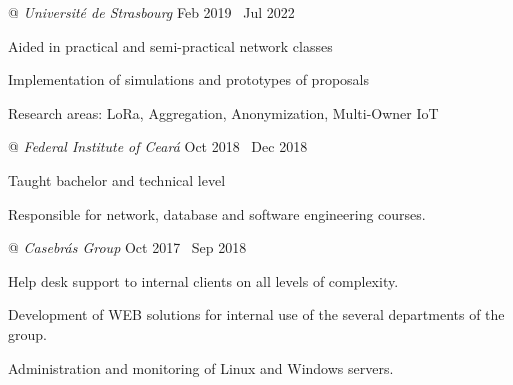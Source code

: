 \newlength{\lcolwidth}
\setlength{\lcolwidth}{.8\textwidth}
\newlength{\rcolwidth}
\setlength{\rcolwidth}{\dimexpr(\textwidth - \lcolwidth)\relax}





 @ \textit{Université de Strasbourg} \dotfill \enspace Feb 2019 \textemdash\ Jul 2022
\begin{minipage}[t]{\lcolwidth}
\raggedright
{\small \begin{zitemize}
  \item Aided in practical and semi-practical network classes
  \item Implementation of simulations and prototypes of proposals
  \item Research areas: LoRa, Aggregation, Anonymization, Multi-Owner IoT
\end{zitemize}}
\end{minipage}%
\begin{minipage}[t]{\rcolwidth}
\raggedleft
{}
\end{minipage}
\enskip




 @ \textit{Federal Institute of Ceará} \dotfill \enspace Oct 2018 \textemdash\ Dec 2018
\begin{minipage}[t]{\lcolwidth}
\raggedright
{\small \begin{zitemize}
  \item Taught bachelor and technical level

  \item Responsible for network, database and software engineering courses.
\end{zitemize}}
\end{minipage}%
\begin{minipage}[t]{\rcolwidth}
\raggedleft
{}
\end{minipage}
\enskip


 @ \textit{Casebrás Group} \dotfill \enspace Oct 2017 \textemdash\ Sep 2018
\begin{minipage}[t]{\lcolwidth}
\raggedright
{\small \begin{zitemize}
  \item Help desk support to internal clients on all levels of complexity.

  \item Development of WEB solutions for internal use of the several departments of the group.

  \item Administration and monitoring of Linux and Windows servers.
\end{zitemize}}
\end{minipage}%
\begin{minipage}[t]{\rcolwidth}
\raggedleft
{}
\end{minipage}
\enskip




